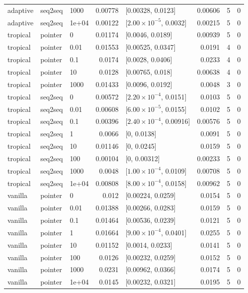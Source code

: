 \documentclass[10pt]{article}
\begin{document}
{\begin{longtable}{lllrlrrr}
adaptive & seq2seq & 1000 & 0.00778 & [0.00328, 0.0123] & 0.00606 & 5 & 0\\
adaptive & seq2seq & 1e+04 & 0.00122 & [$2.00\times10^{-5}$, 0.0032] & 0.00215 & 5 & 0\\
tropical & pointer & 0 & 0.01174 & [0.0046, 0.0189] & 0.00939 & 5 & 0\\
tropical & pointer & 0.01 & 0.01553 & [0.00525, 0.0347] & 0.0191 & 4 & 0\\
tropical & pointer & 0.1 & 0.0174 & [0.0028, 0.0406] & 0.0233 & 4 & 0\\
tropical & pointer & 10 & 0.0128 & [0.00765, 0.018] & 0.00638 & 4 & 0\\
tropical & pointer & 1000 & 0.01433 & [0.0096, 0.0192] & 0.0048 & 3 & 0\\
tropical & seq2seq & 0 & 0.00572 & [$2.20\times10^{-4}$, 0.0151] & 0.0103 & 5 & 0\\
tropical & seq2seq & 0.01 & 0.00608 & [$6.00\times10^{-5}$, 0.0155] & 0.0102 & 5 & 0\\
tropical & seq2seq & 0.1 & 0.00396 & [$2.40\times10^{-4}$, 0.00916] & 0.00576 & 5 & 0\\
tropical & seq2seq & 1 & 0.0066 & [0, 0.0138] & 0.0091 & 5 & 0\\
tropical & seq2seq & 10 & 0.01146 & [0, 0.0245] & 0.0159 & 5 & 0\\
tropical & seq2seq & 100 & 0.00104 & [0, 0.00312] & 0.00233 & 5 & 0\\
tropical & seq2seq & 1000 & 0.0048 & [$1.00\times10^{-4}$, 0.0109] & 0.00708 & 5 & 0\\
tropical & seq2seq & 1e+04 & 0.00808 & [$8.00\times10^{-4}$, 0.0158] & 0.00962 & 5 & 0\\
vanilla & pointer & 0 & 0.012 & [0.00224, 0.0259] & 0.0154 & 5 & 0\\
vanilla & pointer & 0.01 & 0.01388 & [0.00266, 0.0283] & 0.0159 & 5 & 0\\
vanilla & pointer & 0.1 & 0.01464 & [0.00536, 0.0239] & 0.0121 & 5 & 0\\
vanilla & pointer & 1 & 0.01664 & [$9.00\times10^{-4}$, 0.0401] & 0.0255 & 5 & 0\\
vanilla & pointer & 10 & 0.01152 & [0.0014, 0.0233] & 0.0141 & 5 & 0\\
vanilla & pointer & 100 & 0.0126 & [0.00232, 0.0259] & 0.0152 & 5 & 0\\
vanilla & pointer & 1000 & 0.0231 & [0.00962, 0.0366] & 0.0174 & 5 & 0\\
vanilla & pointer & 1e+04 & 0.0145 & [0.00232, 0.0321] & 0.0195 & 5 & 0\\

\end{longtable}}
\end{document}
